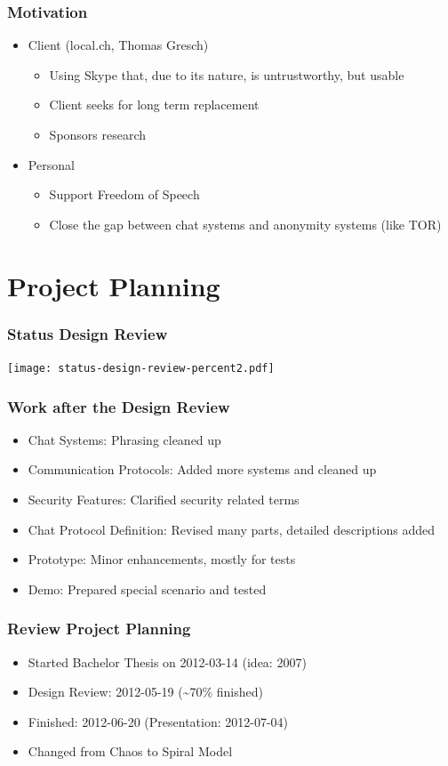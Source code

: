 \documentclass{beamer}
\begin{document}
\frame
{
  \frametitle{Motivation}
  \begin{itemize}
     \item Client (local.ch, Thomas Gresch)
     \begin{itemize}
        \item Using Skype that, due to its nature, is untrustworthy, but usable
        \item Client seeks for long term replacement 
        \item Sponsors research
    \end{itemize}
     \item Personal
     \begin{itemize}
        \item Support Freedom of Speech
        \item Close the gap between chat systems and anonymity systems (like TOR)
    \end{itemize}
  \end{itemize}
}

\section{Project Planning}
\frame
{
    \frametitle{Status Design Review}
    \begin{center}
    \texttt{[image: status-design-review-percent2.pdf]}
    \end{center}
}

\frame
{
    \frametitle{Work after the Design Review}
    \begin{itemize}
    \item Chat Systems: Phrasing cleaned up
    \item Communication Protocols: Added more systems and cleaned up
    \item Security Features: Clarified security related terms
    \item Chat Protocol Definition: Revised many parts, detailed descriptions added
    \item Prototype: Minor enhancements, mostly for tests
    \item Demo: Prepared special scenario and tested
    \end{itemize}
}

\frame
{
    \frametitle{Review Project Planning}
    \begin{itemize}
    \item Started Bachelor Thesis on 2012-03-14 (idea: 2007)
    \item Design Review: 2012-05-19 (\textasciitilde{}70\% finished)
    \item Finished: 2012-06-20 (Presentation: 2012-07-04)
    \item Changed from Chaos to Spiral Model
    \end{itemize}
}
\end{document}
